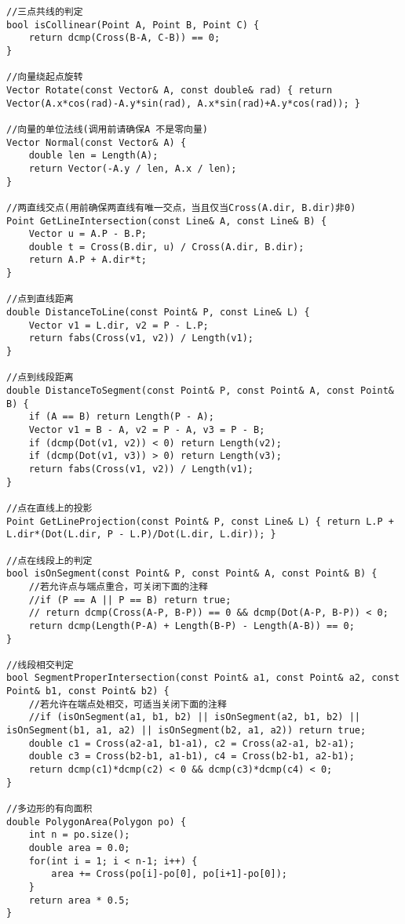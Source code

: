 \documentclass[twocolumn,a4]{article}
\begin{document}
\begin{lstlisting}
//三点共线的判定
bool isCollinear(Point A, Point B, Point C) {
    return dcmp(Cross(B-A, C-B)) == 0;
}
 
//向量绕起点旋转
Vector Rotate(const Vector& A, const double& rad) { return Vector(A.x*cos(rad)-A.y*sin(rad), A.x*sin(rad)+A.y*cos(rad)); }
 
//向量的单位法线(调用前请确保A 不是零向量)
Vector Normal(const Vector& A) {
    double len = Length(A);
    return Vector(-A.y / len, A.x / len);
}
 
//两直线交点(用前确保两直线有唯一交点，当且仅当Cross(A.dir, B.dir)非0)
Point GetLineIntersection(const Line& A, const Line& B) {
    Vector u = A.P - B.P;
    double t = Cross(B.dir, u) / Cross(A.dir, B.dir);
    return A.P + A.dir*t;
}
 
//点到直线距离
double DistanceToLine(const Point& P, const Line& L) {
    Vector v1 = L.dir, v2 = P - L.P;
    return fabs(Cross(v1, v2)) / Length(v1);
}
 
//点到线段距离
double DistanceToSegment(const Point& P, const Point& A, const Point& B) {
    if (A == B) return Length(P - A);
    Vector v1 = B - A, v2 = P - A, v3 = P - B;
    if (dcmp(Dot(v1, v2)) < 0) return Length(v2);
    if (dcmp(Dot(v1, v3)) > 0) return Length(v3);
    return fabs(Cross(v1, v2)) / Length(v1);
}
 
//点在直线上的投影
Point GetLineProjection(const Point& P, const Line& L) { return L.P + L.dir*(Dot(L.dir, P - L.P)/Dot(L.dir, L.dir)); }
 
//点在线段上的判定
bool isOnSegment(const Point& P, const Point& A, const Point& B) {
    //若允许点与端点重合，可关闭下面的注释
    //if (P == A || P == B) return true;
    // return dcmp(Cross(A-P, B-P)) == 0 && dcmp(Dot(A-P, B-P)) < 0;
    return dcmp(Length(P-A) + Length(B-P) - Length(A-B)) == 0;
}
 
//线段相交判定
bool SegmentProperIntersection(const Point& a1, const Point& a2, const Point& b1, const Point& b2) {
    //若允许在端点处相交，可适当关闭下面的注释
    //if (isOnSegment(a1, b1, b2) || isOnSegment(a2, b1, b2) || isOnSegment(b1, a1, a2) || isOnSegment(b2, a1, a2)) return true;
    double c1 = Cross(a2-a1, b1-a1), c2 = Cross(a2-a1, b2-a1);
    double c3 = Cross(b2-b1, a1-b1), c4 = Cross(b2-b1, a2-b1);
    return dcmp(c1)*dcmp(c2) < 0 && dcmp(c3)*dcmp(c4) < 0;
}
 
//多边形的有向面积
double PolygonArea(Polygon po) {
    int n = po.size();
    double area = 0.0;
    for(int i = 1; i < n-1; i++) {
        area += Cross(po[i]-po[0], po[i+1]-po[0]);
    }
    return area * 0.5;
}
 

\end{lstlisting}
\end{document}
